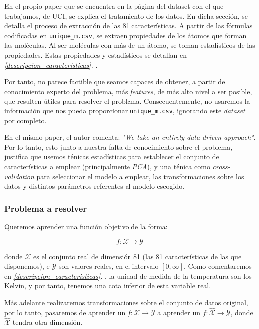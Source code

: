 \documentclass[11pt]{article}
\begin{document}
En el propio paper \cite{original_paper_reg:paper} que se encuentra en la página del dataset con el que trabajamos, de UCI, se explica el tratamiento de los datos. En dicha sección, se detalla el proceso de extracción de las 81 características. A partir de las fórmulas codificadas en \lstinline{unique_m.csv}, se extraen propiedades de los átomos que forman las moléculas. Al ser moléculas con más de un átomo, se toman estadísticos de las propiedades. Estas propiedades y estadísticos se detallan en \emph{\ref{descripcion_caracteristicas}. }.

Por tanto, no parece factible que seamos capaces de obtener, a partir de conocimiento experto del problema, más \emph{features}, de más alto nivel a ser posible, que resulten útiles para resolver el problema. Consecuentemente, no usaremos la información que nos pueda proporcionar \lstinline{unique_m.csv}, ignorando este \emph{dataset} por completo.

En el mismo paper, el autor comenta: \emph{"We take an entirely data-driven approach"}. Por lo tanto, esto junto a nuestra falta de conocimiento sobre el problema, justifica que usemos ténicas estadísticas para establecer el conjunto de características a emplear (principalmente \emph{PCA}), y una ténica como \emph{cross-validation} para seleccionar el modelo a emplear, las transformaciones sobre los datos y distintos parámetros referentes al modelo escogido.

\pagebreak

\subsubsection{Problema a resolver}

Queremos aprender una función objetivo de la forma:

$$f: \mathcal{X} \rightarrow \mathcal{Y}$$

donde $\mathcal{X}$ es el conjunto real de dimensión 81 (las 81 características de las que disponemos), e $\mathcal{Y}$ son valores reales, en el intervalo $[0, \infty]$. Como comentaremos en \emph{\ref{descripcion_caracteristicas}. }, la unidad de medida de la temperatura son los Kelvin, y por tanto, tenemos una cota inferior de esta variable real.

Más adelante realizaremos transformaciones sobre el conjunto de datos original, por lo tanto, pasaremos de aprender un $f: \mathcal{X} \rightarrow \mathcal{Y}$ a aprender un $f: \hat{\mathcal{X}} \rightarrow \mathcal{Y}$, donde $\hat{\mathcal{X}}$ tendra otra dimensión.
\end{document}
